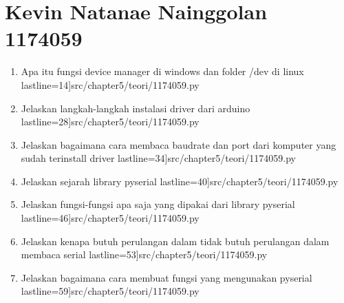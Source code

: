 \section {Kevin Natanae Nainggolan 1174059}
	\begin {enumerate}
		\item  Apa itu fungsi device manager di windows dan folder /dev di linux
			 lastline=14]{src/chapter5/teori/1174059.py}
		\item Jelaskan langkah-langkah instalasi driver dari arduino
			 lastline=28]{src/chapter5/teori/1174059.py}
		\item Jelaskan bagaimana cara membaca baudrate dan port dari komputer yang sudah terinstall driver
			 lastline=34]{src/chapter5/teori/1174059.py}
		\item Jelaskan sejarah library pyserial
			 lastline=40]{src/chapter5/teori/1174059.py}
		\item Jelaskan fungsi-fungsi apa saja yang dipakai dari library pyserial
			 lastline=46]{src/chapter5/teori/1174059.py}
		\item Jelaskan kenapa butuh perulangan dalam tidak butuh perulangan dalam membaca serial
			 lastline=53]{src/chapter5/teori/1174059.py}
		\item Jelaskan bagaimana cara membuat fungsi yang mengunakan pyserial
			 lastline=59]{src/chapter5/teori/1174059.py}
	\end {enumerate}